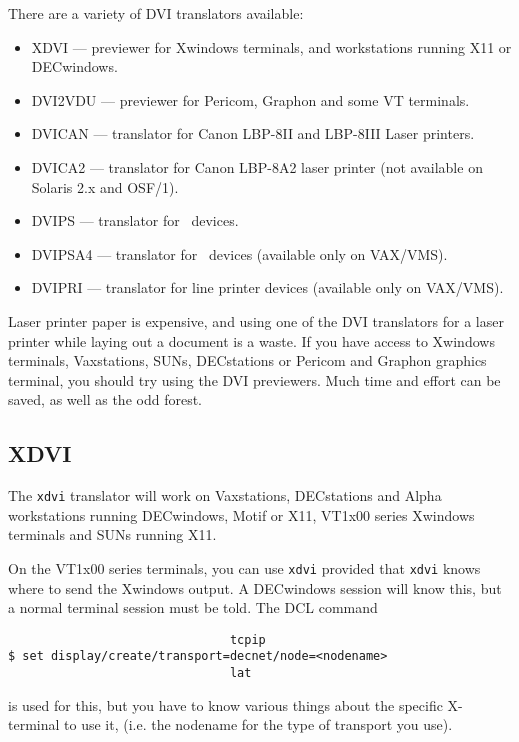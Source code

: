 There are a variety of DVI translators available:
\begin{itemize}
\item XDVI --- previewer for Xwindows terminals, and workstations running X11
or DECwindows.
\item DVI2VDU --- previewer for Pericom, Graphon and some VT terminals.
\item DVICAN --- translator for Canon LBP-8II and LBP-8III Laser printers.
\item DVICA2 --- translator for Canon LBP-8A2 laser printer (not available on
Solaris 2.x and OSF/1).
\item DVIPS --- translator for \PS\ devices.
\item DVIPSA4 --- translator for \PS\ devices (available only on VAX/VMS).
\item DVIPRI --- translator for line printer devices (available only on
VAX/VMS).
\end{itemize}

Laser printer paper is expensive, and using one of the DVI translators for a
laser printer while laying out a document is a waste. If you have access to
Xwindows terminals, Vaxstations, SUNs, DECstations or Pericom and Graphon
graphics terminal, you should try using the DVI previewers. Much time and
effort can be saved, as well as the odd forest.

\subsection{XDVI}
\label{se:dvixdvi}

The \verb+xdvi+ translator will work on Vaxstations, DECstations and Alpha
workstations running DECwindows, Motif or X11, VT1x00 series Xwindows terminals
and SUNs running X11.  

On the VT1x00 series terminals, you can use \verb+xdvi+ provided that \verb+xdvi+ knows where
to send the Xwindows output. A DECwindows session will know this, but a normal
terminal session must be told. The DCL command 
\begin{verbatim}
                               tcpip
$ set display/create/transport=decnet/node=<nodename>
                               lat 
\end{verbatim}
is used for this, 
but you have to know various things about the specific X-terminal to use it,
(i.e. the nodename for the type of transport you use).

